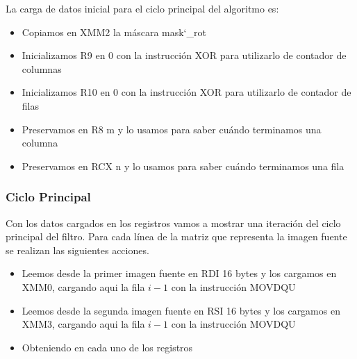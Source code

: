 \indent La carga de datos inicial para el ciclo principal del algoritmo es:


\begin{itemize}
\item Copiamos en {\ttfamily XMM2} la m\'ascara mask\char`_rot
\item Inicializamos {\ttfamily R9} en 0 con la instrucción {\ttfamily XOR} para utilizarlo de contador de columnas
\item Inicializamos {\ttfamily R10} en 0 con la instrucción {\ttfamily XOR} para utilizarlo de contador de filas
\item Preservamos en {\ttfamily R8} m y lo usamos para saber cu\'ando terminamos una columna
\item Preservamos en {\ttfamily RCX} n y lo usamos para saber cu\'ando terminamos una fila

\end{itemize}

\subsubsection{Ciclo Principal}


\indent Con los datos cargados en los registros vamos a mostrar una iteraci\'on del ciclo principal del filtro. Para cada l\'inea de la matriz que representa la imagen fuente se realizan las siguientes acciones.

\begin{itemize}
\item Leemos desde la primer imagen fuente en {\ttfamily RDI} 16 bytes y los cargamos en {\ttfamily XMM0}, cargando aqui la fila $i - 1$ con la instrucción {\ttfamily MOVDQU}
\item Leemos desde la segunda imagen fuente en {\ttfamily RSI} 16 bytes y los cargamos en {\ttfamily XMM3}, cargando aqui la fila $i - 1$ con la instrucción {\ttfamily MOVDQU}

\item Obteniendo en cada uno de los registros

\begin{center}
\end{center}


\end{itemize}
